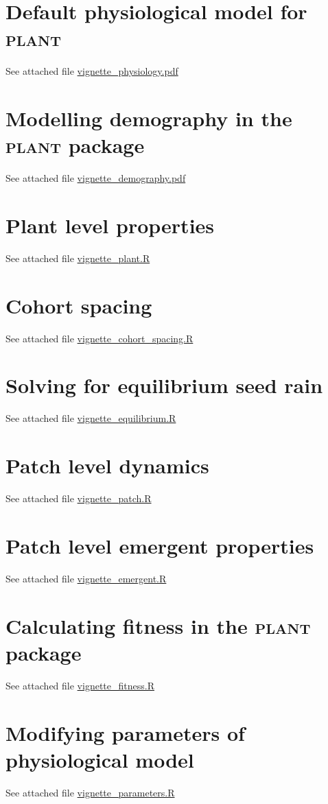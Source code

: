 \documentclass[a4paper,11pt]{article}
\newcommand{\plant}{\textsc{plant}}
\begin{document}
\begin{appendices}\label{sec:appendices}

\section{Default physiological model for {\plant}}\label{sec:FFW16}

See attached file \url{vignette_physiology.pdf}

\section{Modelling demography in the {\plant} package}\label{sec:demography}

See attached file \url{vignette_demography.pdf}

\section{Plant level properties}\label{sec:plant}

See attached file \url{vignette_plant.R}

\section{Cohort spacing}\label{sec:cohort-spacing}

See attached file \url{vignette_cohort_spacing.R}

\section{Solving for equilibrium seed rain}\label{sec:equilibrium}

See attached file \url{vignette_equilibrium.R}

\section{Patch level dynamics}\label{sec:patch}

See attached file \url{vignette_patch.R}

\section{Patch level emergent properties}\label{sec:emergent}

See attached file \url{vignette_emergent.R}

\section{Calculating fitness in the {\plant}  package}\label{sec:fitness}

See attached file \url{vignette_fitness.R}

\section{Modifying parameters of physiological model}\label{sec:parameters}

See attached file \url{vignette_parameters.R}

\end{appendices}
\end{document}

